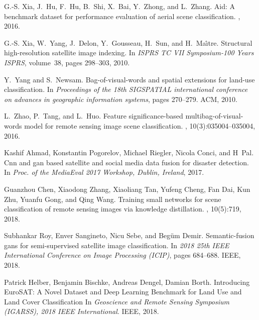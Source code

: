 \documentclass[journal]{IEEEtran}
\begin{document}
\begin{thebibliography}{1}
G.-S. Xia, J.~Hu, F.~Hu, B.~Shi, X.~Bai, Y.~Zhong, and L.~Zhang.
\newblock Aid: A benchmark dataset for performance evaluation of aerial scene
  classification.
, 2016.

G.-S. Xia, W.~Yang, J.~Delon, Y.~Gousseau, H.~Sun, and H.~Ma{\^\i}tre.
\newblock Structural high-resolution satellite image indexing.
\newblock In {\em ISPRS TC VII Symposium-100 Years ISPRS}, volume~38, pages
  298--303, 2010.

Y.~Yang and S.~Newsam.
\newblock Bag-of-visual-words and spatial extensions for land-use
  classification.
\newblock In {\em Proceedings of the 18th SIGSPATIAL international conference
  on advances in geographic information systems}, pages 270--279. ACM, 2010.

L.~Zhao, P.~Tang, and L.~Huo.
\newblock Feature significance-based multibag-of-visual-words model for remote
  sensing image scene classification.
, 10(3):035004--035004, 2016.

Kashif Ahmad, Konstantin Pogorelov, Michael Riegler, Nicola Conci, and H~Pal.
\newblock Cnn and gan based satellite and social media data fusion for disaster
  detection.
\newblock In {\em Proc. of the MediaEval 2017 Workshop, Dublin, Ireland}, 2017.

Guanzhou Chen, Xiaodong Zhang, Xiaoliang Tan, Yufeng Cheng, Fan Dai, Kun Zhu,
  Yuanfu Gong, and Qing Wang.
\newblock Training small networks for scene classification of remote sensing
  images via knowledge distillation.
, 10(5):719, 2018.

Subhankar Roy, Enver Sangineto, Nicu Sebe, and Beg{\"u}m Demir.
\newblock Semantic-fusion gans for semi-supervised satellite image
  classification.
\newblock In {\em 2018 25th IEEE International Conference on Image Processing
  (ICIP)}, pages 684--688. IEEE, 2018.
  
  
Patrick Helber, Benjamin Bischke, Andreas Dengel, Damian Borth.
\newblock Introducing EuroSAT: A Novel Dataset and Deep Learning Benchmark for Land Use and Land Cover Classification
\newblock In {\em Geoscience and Remote Sensing Symposium (IGARSS), 2018 IEEE
  International}. IEEE, 2018.  
  

\end{thebibliography}
\end{document}
